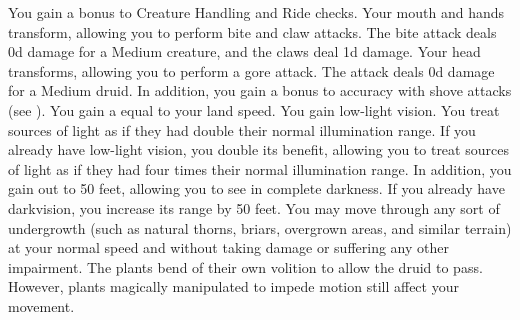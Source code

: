         You gain a  bonus to Creature Handling and Ride checks.
        Your mouth and hands transform, allowing you to perform bite and claw attacks.
        The bite attack deals \plus0d damage for a Medium creature, and the claws deal \minus1d damage.
        Your head transforms, allowing you to perform a gore attack.
        The attack deals \plus0d damage for a Medium druid.
        In addition, you gain a  bonus to accuracy with shove attacks (see ).
        You gain a  equal to your land speed.
        You gain low-light vision.
        You treat sources of light as if they had double their normal illumination range.
        If you already have low-light vision, you double its benefit, allowing you to treat sources of light as if they had four times their normal illumination range.
        In addition, you gain  out to 50 feet, allowing you to see in complete darkness.
        If you already have darkvision, you increase its range by 50 feet.
        You may move through any sort of undergrowth (such as natural thorns, briars, overgrown areas, and similar terrain) at your normal speed and without taking damage or suffering any other impairment.
        The plants bend of their own volition to allow the druid to pass.
        However, plants magically manipulated to impede motion still affect your movement.

